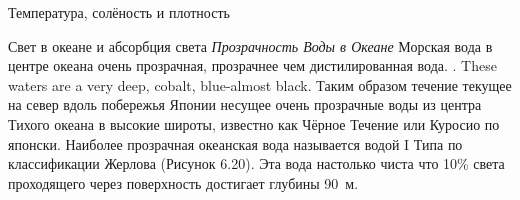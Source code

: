 \begin{chapter}{Температура, солёность и плотность}
\begin{section}{Свет в океане и абсорбция света}
\textit{Прозрачность Воды в Океане} Морская вода в центре океана очень
прозрачная, прозрачнее чем дистилированная вода. . These waters are a
very deep, cobalt, blue-almost black. Таким образом течение текущее на
север вдоль побережья Японии несущее очень прозрачные воды из центра
Тихого океана в высокие широты, известно как Чёрное Течение или
Куросио по японски. Наиболее прозрачная океанская вода называется
водой I Типа по классификации Жерлова (Рисунок 6.20). Эта вода
настолько чиста что 10\% света проходящего через поверхность достигает
глубины 90~м.
%



\end{section}
\end{chapter}
